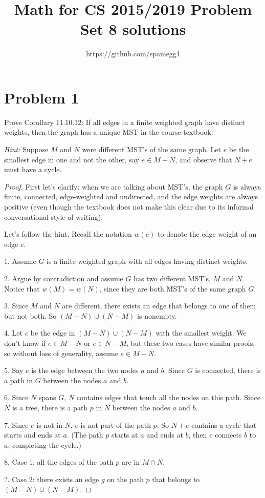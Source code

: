 \documentclass[14pt]{extarticle}
\title{Math for CS 2015/2019 Problem Set 8 solutions}
\author{https://github.com/spamegg1}
\begin{document}
\maketitle
\tableofcontents

\section{Problem 1}
Prove Corollary 11.10.12: If all edges in a finite weighted graph have distinct weights, then the graph has a unique MST in the course textbook.

{\it Hint:} Suppose $M$ and $N$ were different MST’s of the same graph. Let $e$ be the smallest edge in one and not the other, say $e \in M - N$, and observe that $N + e$ must have a cycle.
\begin{proof}
First let's clarify: when we are talking about MST's, the graph $G$ is always finite, connected, edge-weighted and undirected, and the edge weights are always positive (even though the textbook does not make this clear due to its informal conversational style of writing).

Let's follow the hint. Recall the notation $w(e)$ to denote the edge weight of an edge $e$.

1. Assume $G$ is a finite weighted graph with all edges having distinct weights.

2. Argue by contradiction and assume $G$ has two different MST's, $M$ and $N$. Notice that $w(M) = w(N)$, since they are both MST's of the same graph $G$.

3. Since $M$ and $N$ are different, there exists an edge that belongs to one of them but not both. So $(M-N) \cup (N-M)$ is nonempty. 

4. Let $e$ be the edge in $(M-N) \cup (N-M)$ with the smallest weight. We don't know if $e \in M-N$ or $e \in N-M$, but these two cases have similar proofs, so without loss of generality, assume $e \in M-N$.

5. Say $e$ is the edge between the two nodes $a$ and $b$. Since $G$ is connected, there is a path in $G$ between the nodes $a$ and $b$. 

6. Since $N$ spans $G$, $N$ contains edges that touch all the nodes on this path. Since $N$ is a tree, there is a path $p$ in $N$ between the nodes $a$ and $b$.

7. Since $e$ is not in $N$, $e$ is not part of the path $p$. So $N + e$ contains a cycle that starts and ends at $a$. (The path $p$ starts at $a$ and ends at $b$, then $e$ connects $b$ to $a$, completing the cycle.)

8. Case 1: all the edges of the path $p$ are in $M \cap N$.

?. Case 2: there exists an edge $g$ on the path $p$ that belongs to $(M-N) \cup (N-M)$.
\end{proof}
\end{document}
